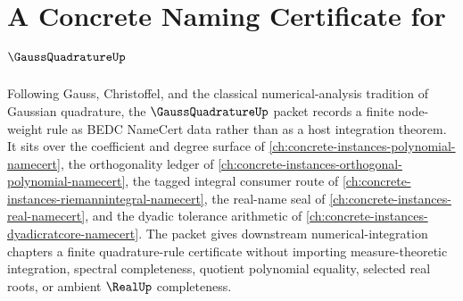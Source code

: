 \chapter{A Concrete Naming Certificate for $\GaussQuadratureUp$}
\label{ch:concrete-instances-gauss-quadrature-namecert}

Following Gauss, Christoffel, and the classical numerical-analysis tradition of Gaussian quadrature, the $\GaussQuadratureUp$ packet records a finite node-weight rule as BEDC NameCert data rather than as a host integration theorem. It sits over the coefficient and degree surface of \autoref{ch:concrete-instances-polynomial-namecert}, the orthogonality ledger of \autoref{ch:concrete-instances-orthogonal-polynomial-namecert}, the tagged integral consumer route of \autoref{ch:concrete-instances-riemannintegral-namecert}, the real-name seal of \autoref{ch:concrete-instances-real-namecert}, and the dyadic tolerance arithmetic of \autoref{ch:concrete-instances-dyadicratcore-namecert}. The packet gives downstream numerical-integration chapters a finite quadrature-rule certificate without importing measure-theoretic integration, spectral completeness, quotient polynomial equality, selected real roots, or ambient $\RealUp$ completeness.

